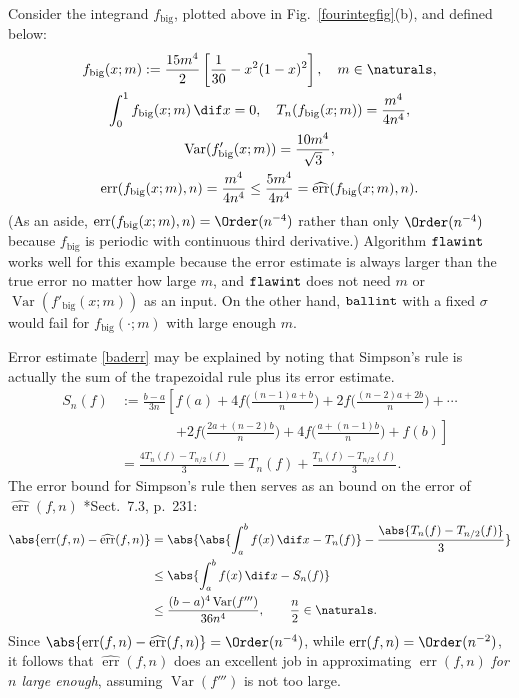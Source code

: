 \documentclass[]{article}
\DeclareMathOperator{\flawinteg}{\texttt{\textup{flawint}}}
\DeclareMathOperator{\ballinteg}{\texttt{\textup{ballint}}}
\DeclareMathOperator{\Var}{Var}
\DeclareMathOperator{\err}{err}
\newcommand{\herr}{\widehat{\err}}
\theoremstyle{definition}
\theoremstyle{remark}
\begin{document}
Consider the integrand $f_{\text{big}}$, plotted above in Fig.\ \ref{fourintegfig}(b), and defined below:
\begin{subequations} \label{fbig}
\begin{gather} 
f_{\text{big}}(x;m) :=  \frac{15 m^4}{2} \left[ \frac{1}{30} - x^2(1-x)^2 \right], \quad m \in \naturals, \\
\int_0^1 f_{\text{big}}(x;m) \, \dif x =  0, \quad T_{n}(f_{\text{big}}(x;m))= \frac{m^4}{4n^4},  \\
\Var(f'_{\text{big}}(x;m)) = \frac{10 m^4}{\sqrt{3}},  \\ \err(f_{\text{big}}(x;m),n)=\frac{m^4}{4n^4} \le \frac{5m^4}{4n^4} = \herr(f_{\text{big}}(x;m),n).
\end{gather}
\end{subequations}
(As an aside, $\err(f_{\text{big}}(x;m),n) = \Order (n^{-4})$ rather than only $\Order (n^{-4})$ because $f_{\text{big}}$ is periodic with continuous third derivative.)  Algorithm $\flawinteg$ works well for this example because the error estimate is always larger than the true error no matter how large $m$, and $\flawinteg$ does not need $m$ or $\Var(f'_{\text{big}}(x;m))$ as an input.  On the other hand, $\ballinteg$ with a fixed $\sigma$ would fail for $f_{\text{big}}(\cdot; m)$ with large enough $m$.

Error estimate \eqref{baderr} may be explained by noting that Simpson's rule is actually the sum of the trapezoidal rule plus its error estimate.
\begin{align*}
S_n(f) &:= \frac{b-a}{3n} \left [ f(a) + 4 f\biggl(\frac{(n-1)a+b}{n}\biggr) + 2 f\biggl(\frac{(n-2)a+2b}{n}\biggr) + \cdots  \right .\\
 & \qquad \qquad \left . + 2 f\biggl(\frac{2a+ (n-2)b}{n}\biggr) + 4 f\biggl(\frac{a+(n-1)b}{n}\biggr) + f(b) \right] \\
& = \frac{4T_n(f) - T_{n/2}(f)}{3} =  T_n(f) + \frac{T_n(f) - T_{n/2}(f)}{3}.
\end{align*}
The error bound for Simpson's rule then serves as an bound on the error of $\herr(f,n)$ \cite{BraPet11a}*{Sect.\ 7.3, p.\ 231}:
\begin{align} 
\nonumber
\abs{\err(f,n) - \herr(f,n)} & = \abs{\abs{\int_a^b f(x) \, \dif x - T_n(f)} - \frac{\abs{T_n(f) - T_{n/2}(f)}}{3}} \\
\nonumber & \le \abs{\int_a^b f(x) \, \dif x - S_n(f)} \\
& \le \frac{(b-a)^4 \Var(f''')}{36n^4}, \qquad \frac{n}2 \in \naturals. \label{Simperrbd}
\end{align}
Since $\abs{\err(f,n) - \herr(f,n)}=\Order(n^{-4})$, while $\err(f,n) = \Order(n^{-2})$, it follows that $\herr(f,n)$ does an excellent job in approximating $\err(f,n)$ \emph{for $n$ large enough}, assuming $\Var(f''')$ is not too large.
\end{document}
